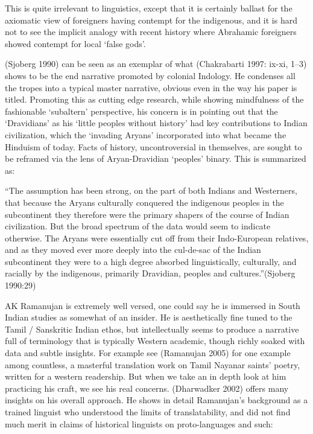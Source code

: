 This is quite irrelevant to linguistics, except that it is certainly ballast for the axiomatic view of foreigners having contempt for the indigenous, and it is hard not to see the implicit analogy with recent history where Abrahamic foreigners showed contempt for local ‘false gods’.

(Sjoberg 1990) can be seen as an exemplar of what (Chakrabarti 1997: ix-xi, 1–3) shows to be the end narrative promoted by colonial Indology. He condenses all the tropes into a typical master narrative, obvious even in the way his paper is titled. Promoting this as cutting edge research, while showing mindfulness of the fashionable ‘subaltern’ perspective, his concern is in pointing out that the ‘Dravidians’ as his ‘little peoples without history’ had key contributions to Indian civilization, which the ‘invading Aryans’ incorporated into what became the Hinduism of today. Facts of history, uncontroversial in themselves, are sought to be reframed via the lens of Aryan-Dravidian ‘peoples’ binary. This is summarized as:

\begin{myquote}
“The assumption has been strong, on the part of both Indians and Westerners, that because the Aryans culturally conquered the indigenous peoples in the subcontinent they therefore were the primary shapers of the course of Indian civilization. But the broad spectrum of the data would seem to indicate otherwise. The Aryans were essentially cut off from their Indo-European relatives, and as they moved ever more deeply into the cul-de-sac of the Indian subcontinent they were to a high degree absorbed linguistically, culturally, and racially by the indigenous, primarily Dravidian, peoples and cultures.”\hfill (Sjoberg 1990:29)
\end{myquote}

AK Ramanujan is extremely well versed, one could say he is immersed in South Indian studies as somewhat of an insider. He is aesthetically fine tuned to the Tamil / Sanskritic Indian ethos, but intellectually seems to produce a narrative full of terminology that is typically Western academic, though richly soaked with data and subtle insights. For example see (Ramanujan 2005) for one example among countless, a masterful translation work on Tamil Nayanar saints’ poetry, written for a western readership. But when we take an in depth look at him practicing his craft, we see his real concerns. (Dharwadker 2002) offers many insights on his overall approach. He shows in detail Ramanujan’s background as a trained linguist who understood the limits of translatability, and did not find much merit in claims of historical linguists on proto-languages and such:

